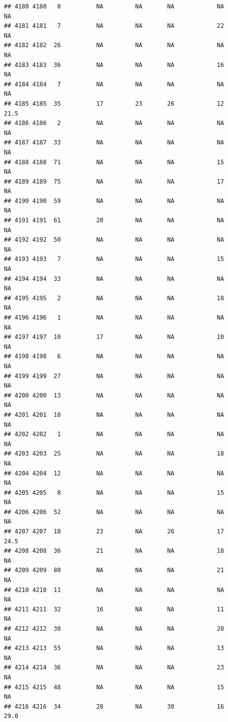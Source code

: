 \documentclass[man]{apa6}
\begin{document}
\begin{verbatim}
## 4180 4180   0          NA         NA       NA            NA       NA
## 4181 4181   7          NA         NA       NA            22       NA
## 4182 4182  26          NA         NA       NA            NA       NA
## 4183 4183  36          NA         NA       NA            16       NA
## 4184 4184   7          NA         NA       NA            NA       NA
## 4185 4185  35          17         23       26            12     21.5
## 4186 4186   2          NA         NA       NA            NA       NA
## 4187 4187  33          NA         NA       NA            NA       NA
## 4188 4188  71          NA         NA       NA            15       NA
## 4189 4189  75          NA         NA       NA            17       NA
## 4190 4190  59          NA         NA       NA            NA       NA
## 4191 4191  61          20         NA       NA            NA       NA
## 4192 4192  50          NA         NA       NA            NA       NA
## 4193 4193   7          NA         NA       NA            15       NA
## 4194 4194  33          NA         NA       NA            NA       NA
## 4195 4195   2          NA         NA       NA            18       NA
## 4196 4196   1          NA         NA       NA            NA       NA
## 4197 4197  10          17         NA       NA            10       NA
## 4198 4198   6          NA         NA       NA            NA       NA
## 4199 4199  27          NA         NA       NA            NA       NA
## 4200 4200  13          NA         NA       NA            NA       NA
## 4201 4201  10          NA         NA       NA            NA       NA
## 4202 4202   1          NA         NA       NA            NA       NA
## 4203 4203  25          NA         NA       NA            18       NA
## 4204 4204  12          NA         NA       NA            NA       NA
## 4205 4205   8          NA         NA       NA            15       NA
## 4206 4206  52          NA         NA       NA            NA       NA
## 4207 4207  10          23         NA       26            17     24.5
## 4208 4208  36          21         NA       NA            18       NA
## 4209 4209  80          NA         NA       NA            21       NA
## 4210 4210  11          NA         NA       NA            NA       NA
## 4211 4211  32          16         NA       NA            11       NA
## 4212 4212  30          NA         NA       NA            20       NA
## 4213 4213  55          NA         NA       NA            13       NA
## 4214 4214  36          NA         NA       NA            23       NA
## 4215 4215  48          NA         NA       NA            15       NA
## 4216 4216  34          28         NA       30            16     29.0

\end{verbatim}
\end{document}
